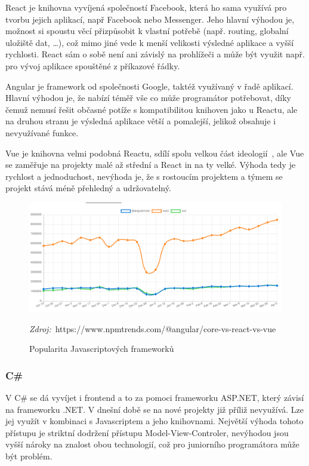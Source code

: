 React je knihovna vyvíjená společností Facebook, která ho sama využívá pro tvorbu jejich aplikací, např Facebook nebo Messenger. Jeho hlavní výhodou je, možnost si spoustu věcí přizpůsobit k vlastní potřebě (např. routing, globalní uložiště dat, \ldots{}), což mimo jiné vede k menší velikosti výsledné aplikace a vyšší rychlosti. React sám o sobě není ani závislý na prohlížeči a může být využit např. pro vývoj aplikace spouštěné z příkazové řádky.

Angular je framework od společnosti Google, taktéž využívaný v řadě aplikací. Hlavní výhodou je, že nabízí téměř vše co může programátor potřebovat, díky čemuž nemusí řešit občasné potíže s kompatibilitou knihoven jako u Reactu, ale na druhou stranu je výsledná aplikace větší a pomalejší, jelikož obsahuje i nevyužívané funkce.

Vue je knihovna velmi podobná Reactu, sdílí spolu velkou část ideologií~\cite{you_2014_comparison}, ale Vue se zaměřuje na projekty malé až střední a React in na ty velké. Výhoda tedy je rychlost a jednoduchost, nevýhoda je, že s rostoucím projektem a týmem se projekt stává méně přehledný a udržovatelný.

\begin{figure}[h!]
    \centering
    \includegraphics[width=\textwidth]{assets/popularity_plot.png}
    \caption{Popularita Javascriptových frameworků}
    \label{fig:popularity_plot}
    \textit{Zdroj:}~https://www.npmtrends.com/@angular/core-vs-react-vs-vue
\end{figure}

\subsubsection*{C\# }
V C\# se dá vyvíjet i frontend a to za pomoci frameworku ASP.NET, který závisí na frameworku .NET. V dnešní době se na nové projekty již příliž nevyužívá. Lze jej využít v kombinaci s Javascriptem a jeho knihovnami. Největší výhoda tohoto přístupu je striktní dodržení přístupu Model-View-Controler, nevýhodou jsou vyšší nároky na znalost obou technologií, což pro juniorního programátora může být problém.

